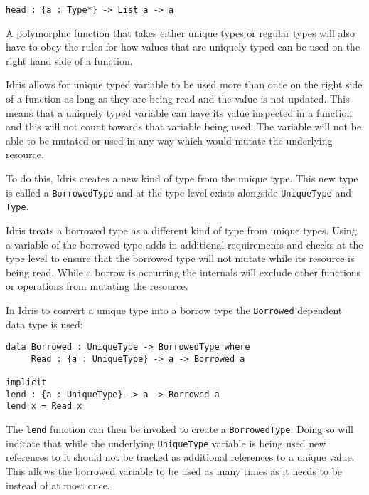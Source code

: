 \documentclass[onehalf,11pt]{beavtex}
\begin{document}
\begin{verbatim}
head : {a : Type*} -> List a -> a
\end{verbatim}

A polymorphic function that takes either unique types or regular types will also
have to obey the rules for how values that are uniquely typed can be used
on the right hand side of a function.


Idris allows for unique typed variable to be used more than once on the right
side of a function as long as they are being read and the value is not
updated.
This means that a uniquely typed variable can have its value inspected in a
function and this will not count towards that variable being used.
The variable will not be able to be mutated or used in any way which would
mutate the underlying resource.

To do this, Idris creates a new kind of type from the unique type.
This new type is called a \texttt{BorrowedType} and at
the type level exists alongside \texttt{UniqueType} and \texttt{Type}.

Idris treats a borrowed type as a different kind of type from unique types.
Using a variable of the borrowed type adds in additional
requirements and checks at the type level to ensure that the borrowed type
will not mutate while its resource is being read.
While a borrow is occurring the internals will exclude other functions or
operations from mutating the resource.

In Idris to convert a unique type into a borrow type the \texttt{Borrowed}
dependent data type is used:

\begin{verbatim}
data Borrowed : UniqueType -> BorrowedType where
     Read : {a : UniqueType} -> a -> Borrowed a

implicit
lend : {a : UniqueType} -> a -> Borrowed a
lend x = Read x
\end{verbatim}

The \texttt{lend} function can then be invoked to create a \texttt{BorrowedType}.
Doing so will indicate that while the underlying \texttt{UniqueType} variable is
being used new references to it should not be tracked as additional references
to a unique value.  This allows the borrowed variable to be used as many times
as it needs to be instead of at most once. 

\end{document}
